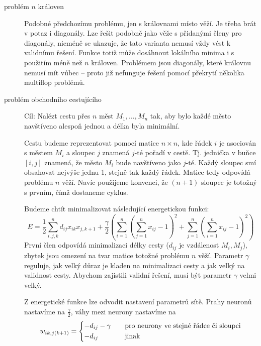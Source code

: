 \documentclass[11pt]{report} %
\numberwithin{equation}{section}
\begin{document}
\begin{description}
	\item[problém $n$ královen] Podobné předchozímu problému, jen s královnami místo věží. Je třeba brát v potaz i diagonály. Lze řešit podobně jako věže s přidanými členy pro diagonály, nicméně se ukazuje, že tato varianta nemusí vždy vést k validnímu řešení. Funkce totiž může dosáhnout lokálního minima i s použitím méně než $n$ královen. Problémem jsou diagonály, které královnu nemusí mít vůbec -- proto již nefunguje řešení pomocí překrytí několika multiflop problémů.
	
	\item[problém obchodního cestujícího] Cíl: Nalézt cestu přes $n$ měst $M_1, \dots, M_n$ tak, aby bylo každé město navštíveno alespoň jednou a délka  byla minimální.
	
	Cestu budeme reprezentovat pomocí matice $n \times n$, kde řádek $i$ je asociován s městem $M_i$ a sloupec $j$ znamená $j$-té pořadí v cestě. Tj. jednička v buňce $[i,j]$ znamená, že město $M_i$ bude navštíveno jako $j$-té. Každý sloupec smí obsahovat nejvýše jednu 1, stejně tak každý řádek. Matice tedy odpovídá problému $n$ věží. Navíc použijeme konvenci, že $(n+1)$ sloupec je totožný s prvním, čímž dostaneme cyklus.
	
	Budeme chtít minimalizovat následující energetickou funkci:
	$$E = \frac{1}{2}\sum\limits_{i,j,k}^{n}d_{ij}x_{ik}x_{j,k+1} + \frac{\gamma}{2}\left(\sum\limits_{i=1}^{n}\left(\sum\limits_{j=1}^{n} x_{ij} - 1 \right)^2 + \sum\limits_{j=1}^{n}\left(\sum\limits_{i=1}^{n} x_{ij} - 1 \right)^2\right)$$
	První člen odpovídá minimalizaci délky cesty ($d_{ij}$ je vzdálenost $M_i, M_j$), zbytek jsou omezení na tvar matice totožné problému $n$ věží. Parametr $\gamma$ reguluje, jak velký důraz je kladen na minimalizaci cesty a jak velký na validnost cesty. Abychom zajistili validní řešení, musí být parametr $\gamma$ velmi velký.
	
	Z energetické funkce lze odvodit nastavení parametrů sítě. Prahy neuronů nastavíme na $\frac{\gamma}{2}$, váhy mezi neurony nastavíme na 
	$$
	w_{ik,j(k+1)} = 
	\begin{dcases*}
	-d_{ij} - \gamma &\quad pro neurony ve stejné řádce či sloupci\\
	-d_{ij} &\quad jinak
	\end{dcases*}
	$$
\end{description}
\end{document}
